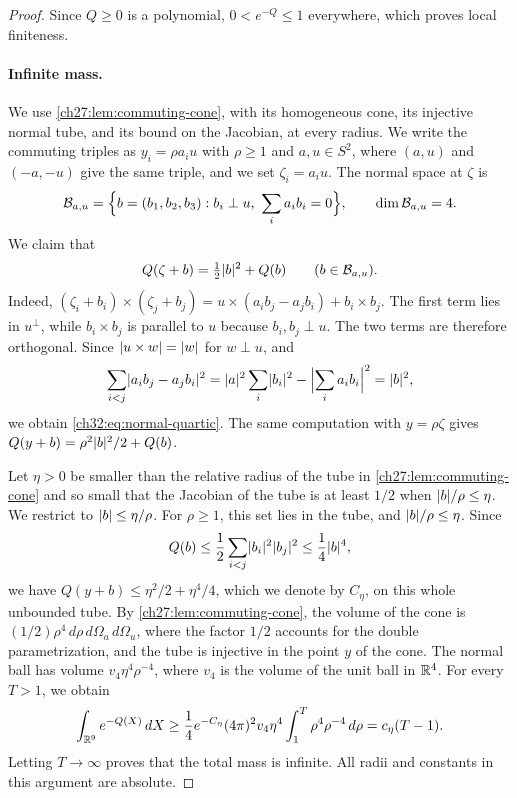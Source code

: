 \begin{proof}
Since $Q\ge0$ is a polynomial, $0<e^{-Q}\le1$ everywhere, which proves local finiteness.

\paragraph{Infinite mass.}
We use \cref{ch27:lem:commuting-cone}, with its homogeneous cone, its injective normal tube, and its bound on the Jacobian, at every radius. We write the commuting triples as $y_i=\rho a_iu$ with $\rho\ge1$ and $a,u\in S^2$, where $(a,u)$ and $(-a,-u)$ give the same triple, and we set $\zeta_i=a_iu$. The normal space at $\zeta$ is
\[
 \mathcal B_{a,u}=\Bigl\{b=(b_1,b_2,b_3):b_i\perp u,\ \sum_ia_ib_i=0\Bigr\},\qquad\dim\mathcal B_{a,u}=4.
\]
We claim that
\begin{equation}\label{ch32:eq:normal-quartic}
 Q(\zeta+b)=\tfrac12\lvert b\rvert^2+Q(b)\qquad(b\in\mathcal B_{a,u}).
\end{equation}
Indeed, $(\zeta_i+b_i)\times(\zeta_j+b_j)=u\times(a_ib_j-a_jb_i)+b_i\times b_j$. The first term lies in $u^\perp$, while $b_i\times b_j$ is parallel to $u$ because $b_i,b_j\perp u$. The two terms are therefore orthogonal. Since $\lvert u\times w\rvert=\lvert w\rvert$ for $w\perp u$, and
\[
 \sum_{i<j}\lvert a_ib_j-a_jb_i\rvert^2=\lvert a\rvert^2\sum_i\lvert b_i\rvert^2-\Bigl\lvert\sum_ia_ib_i\Bigr\rvert^2=\lvert b\rvert^2,
\]
we obtain \eqref{ch32:eq:normal-quartic}. The same computation with $y=\rho\zeta$ gives $Q(y+b)=\rho^2\lvert b\rvert^2/2+Q(b)$.

Let $\eta>0$ be smaller than the relative radius of the tube in \cref{ch27:lem:commuting-cone} and so small that the Jacobian of the tube is at least $1/2$ when $\lvert b\rvert/\rho\le\eta$. We restrict to $\lvert b\rvert\le\eta/\rho$. For $\rho\ge1$, this set lies in the tube, and $\lvert b\rvert/\rho\le\eta$. Since
\[
 Q(b)\le\frac12\sum_{i<j}\lvert b_i\rvert^2\lvert b_j\rvert^2\le\frac14\lvert b\rvert^4,
\]
we have $Q(y+b)\le\eta^2/2+\eta^4/4$, which we denote by $C_\eta$, on this whole unbounded tube. By \cref{ch27:lem:commuting-cone}, the volume of the cone is $(1/2)\rho^4\,d\rho\,d\Omega_a\,d\Omega_u$, where the factor $1/2$ accounts for the double parametrization, and the tube is injective in the point $y$ of the cone. The normal ball has volume $v_4\eta^4\rho^{-4}$, where $v_4$ is the volume of the unit ball in $\mathbb R^4$. For every $T>1$, we obtain
\[
 \int_{\mathbb R^9}e^{-Q(X)}\,dX\ge\frac14e^{-C_\eta}(4\pi)^2v_4\eta^4\int_1^T\rho^4\rho^{-4}\,d\rho=c_\eta(T-1).
\]
Letting $T\to\infty$ proves that the total mass is infinite. All radii and constants in this argument are absolute.


\end{proof}
